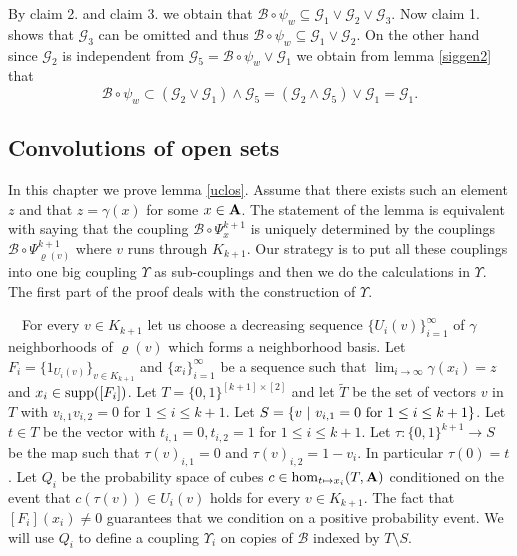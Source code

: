 \documentclass [11pt] {article}
\def\to{\rightarrow}
\def\bA{{\bf A}}
\begin{document}
\medskip

By claim 2. and claim 3. we obtain that $\mathcal{B}\circ\psi_w\subseteq\mathcal{G}_1\vee\mathcal{G}_2\vee\mathcal{G}_3$. Now claim 1. shows that $\mathcal{G}_3$ can be omitted and thus $\mathcal{B}\circ\psi_w\subseteq\mathcal{G}_1\vee\mathcal{G}_2$. On the other hand since $\mathcal{G}_2$ is independent from $\mathcal{G}_5=\mathcal{B}\circ\psi_w\vee\mathcal{G}_1$ we obtain from lemma \ref{siggen2} that $$\mathcal{B}\circ\psi_w\subset (\mathcal{G}_2\vee\mathcal{G}_1)\wedge\mathcal{G}_5=
(\mathcal{G}_2\wedge\mathcal{G}_5)\vee\mathcal{G}_1=\mathcal{G}_1.$$


\subsection{Convolutions of open sets}\label{conopen}

In this chapter we prove lemma \ref{uclos}.
Assume that there exists such an element $z$ and that $z=\gamma(x)$ for some $x\in\bA$.
The statement of the lemma is equivalent with saying that the coupling $\mathcal{B}\circ\Psi_x^{k+1}$ is uniquely determined by the couplings $\mathcal{B}\circ\Psi_{\varrho(v)}^{k+1}$ where $v$ runs through $K_{k+1}$. 
Our strategy is to put all these couplings into one big coupling $\Upsilon$ as sub-couplings and then we do the calculations in $\Upsilon$. The first part of the proof deals with the construction of $\Upsilon$.

\medskip

~~For every $v\in K_{k+1}$ let us choose a decreasing sequence $\{U_i(v)\}_{i=1}^\infty$ of $\gamma$ neighborhoods of $\varrho(v)$ which forms a neighborhood basis.
Let $F_i=\{1_{U_i(v)}\}_{v\in K_{k+1}}$ and $\{x_i\}_{i=1}^\infty$ be a sequence such that $\lim_{i\to\infty}\gamma(x_i)=z$ and $x_i\in{\rm supp}([F_i])$.
Let $T=\{0,1\}^{[k+1]\times[2]}$ and let $\tilde{T}$ be the set of vectors $v$ in $T$ with $v_{i,1}v_{i,2}=0$ for $1\leq i\leq k+1$.  Let $S=\{v~|~v_{i,1}=0~{\rm for}~1\leq i\leq k+1\}$. Let $t\in T$ be the vector with $t_{i,1}=0,t_{i,2}=1$ for $1\leq i\leq k+1$. Let $\tau:\{0,1\}^{k+1}\rightarrow S$ be the map such that $\tau(v)_{i,1}=0$ and $\tau(v)_{i,2}=1-v_i$. In particular $\tau(0)=t$.
Let $Q_i$ be the probability space of cubes $c\in\hom_{t\mapsto x_i}(T,\bA)$ conditioned on the event that $c(\tau(v))\in U_i(v)$ holds for every $v\in K_{k+1}$. The fact that $[F_i](x_i)\neq 0$ guarantees that we condition on a positive probability event. We will use $Q_i$ to define a coupling $\Upsilon_i$ on copies of $\mathcal{B}$ indexed by $T\setminus S$. 
\end{document}
